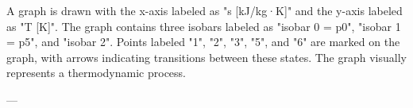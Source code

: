 A graph is drawn with the x-axis labeled as "s [kJ/kg·K]" and the y-axis labeled as "T [K]". The graph contains three isobars labeled as "isobar 0 = p0", "isobar 1 = p5", and "isobar 2". Points labeled "1", "2", "3", "5", and "6" are marked on the graph, with arrows indicating transitions between these states. The graph visually represents a thermodynamic process.

---